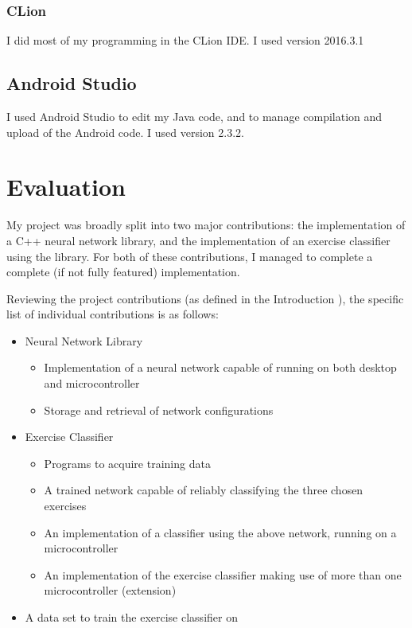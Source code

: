 \documentclass[a4paper]{article}
\begin{document}
\subsubsection{CLion}

I did most of my programming in the CLion\cite{ppref19} IDE. I used version 2016.3.1 

\subsection{Android Studio}

I used Android Studio\cite{ppref20} to edit my Java code, and to manage compilation and upload of the Android code. I used version 2.3.2.

\newpage
\section{Evaluation}

My project was broadly split into two major contributions: the implementation of a C++ neural network library, and the implementation of an exercise classifier using the library. For both of these contributions, I managed to complete a complete (if not fully featured) implementation.

Reviewing the project contributions (as defined in the Introduction ), the specific list of individual contributions is as follows:

\begin{itemize}
\item Neural Network Library 
  \begin{itemize}
  \item Implementation of a neural network capable of running on  both desktop and microcontroller
    \item Storage and retrieval of network configurations
  \end{itemize}
\item Exercise Classifier
  \begin{itemize}
  \item Programs to acquire training data
    \item A trained network capable of reliably classifying the three chosen exercises
    \item An implementation of a classifier using the above network, running on a microcontroller
    \item An implementation of the exercise classifier making use of more than one microcontroller (extension)
  \end{itemize}
\item A data set to train the exercise classifier on
\end{itemize}
\end{document}
